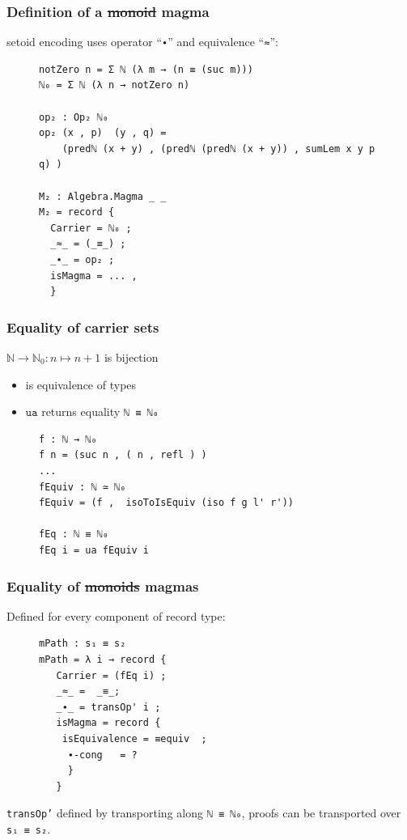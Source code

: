 \documentclass[english,draft]{beamer}
\begin{document}
\begin{frame}[fragile]
\frametitle{Definition of a \st{monoid} magma}

setoid encoding uses operator ``\texttt{∙}'' and equivalence ``\texttt{≈}'':

\begin{figure}
\begin{BVerbatim}
notZero n = Σ ℕ (λ m → (n ≡ (suc m)))
ℕ₀ = Σ ℕ (λ n → notZero n) 

op₂ : Op₂ ℕ₀
op₂ (x , p)  (y , q) = 
    (predℕ (x + y) , (predℕ (predℕ (x + y)) , sumLem x y p q) )

M₂ : Algebra.Magma _ _
M₂ = record { 
  Carrier = ℕ₀ ;
  _≈_ = (_≡_) ;
  _∙_ = op₂ ;
  isMagma = ... ,
  }
\end{BVerbatim}
\end{figure}
 
\end{frame}

\begin{frame}[fragile]
\frametitle{Equality of carrier sets}

 $\mathbb{N} \rightarrow \mathbb{N}_0: n\mapsto n + 1 $ is bijection
 
 \begin{itemize}
  \item is equivalence of types
  \item $\texttt{ua}$ returns equality \texttt{ℕ ≡ ℕ₀}
 \end{itemize}
 
 
 \begin{figure}
 \begin{BVerbatim}
f : ℕ → ℕ₀ 
f n = (suc n , ( n , refl ) )
...
fEquiv : ℕ ≃ ℕ₀ 
fEquiv = (f ,  isoToIsEquiv (iso f g l' r'))

fEq : ℕ ≡ ℕ₀ 
fEq i = ua fEquiv i
 \end{BVerbatim}
\end{figure}

\end{frame}





\begin{frame}[fragile]
\frametitle{Equality of \st{monoids} magmas}

Defined for every component of record type:

\begin{figure}
\begin{BVerbatim}
mPath : s₁ ≡ s₂
mPath = λ i → record {
   Carrier = (fEq i) ;
   _≈_ =  _≡_;
   _∙_ = transOp' i ;
   isMagma = record {
    isEquivalence = ≡equiv  ;
     ∙-cong   = ?
     }
   }
\end{BVerbatim}
\end{figure}

\texttt{transOp'} defined by transporting along \texttt{ℕ ≡ ℕ₀}, proofs can be transported over \texttt{s₁ ≡ s₂}.

\end{frame}
\end{document}
